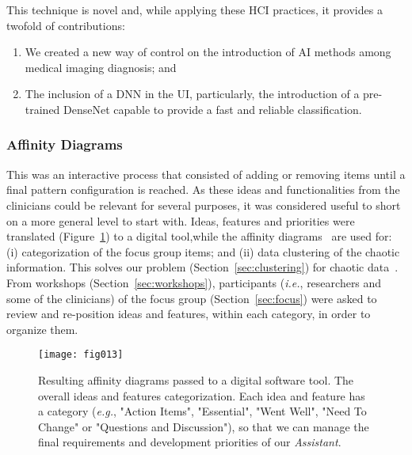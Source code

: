 \hfill

\noindent
This technique is novel and, while applying these HCI practices, it provides a twofold of contributions:

\begin{enumerate}
\item We created a new way of control on the introduction of AI methods among medical imaging diagnosis; and
\item The inclusion of a DNN in the UI, particularly, the introduction of a pre-trained DenseNet capable to provide a fast and reliable classification.
\end{enumerate}

\subsubsection{Affinity Diagrams}
\label{sec:affinity}

This was an interactive process that consisted of adding or removing items until a final pattern configuration is reached.
As these ideas and functionalities from the clinicians could be relevant for several purposes, it was considered useful to short on a more general level to start with.
Ideas, features and priorities were translated (Figure~\ref{fig:fig013}) to a digital tool,\footnotemark[16] while the affinity diagrams~\cite{10.1145/3290605.3300628} are used for: (i) categorization of the focus group items; and (ii) data clustering of the chaotic information.
This solves our problem (Section~\ref{sec:clustering}) for chaotic data~\cite{10.1145/3343413.3377983, 10.1145/2858036.2858373}.
From workshops (Section~\ref{sec:workshops}), participants ({\it i.e.}, researchers and some of the clinicians) of the focus group (Section~\ref{sec:focus}) were asked to review and re-position ideas and features, within each category, in order to organize them.


\begin{figure}[ht]
\centering
\texttt{[image: fig013]}
\caption{Resulting affinity diagrams passed to a digital software tool. The overall ideas and features categorization. Each idea and feature has a category ({\it e.g.}, "Action Items", "Essential", "Went Well", "Need To Change" or "Questions and Discussion"), so that we can manage the final requirements and development priorities of our {\it Assistant}.}
\label{fig:fig013}
\end{figure}

